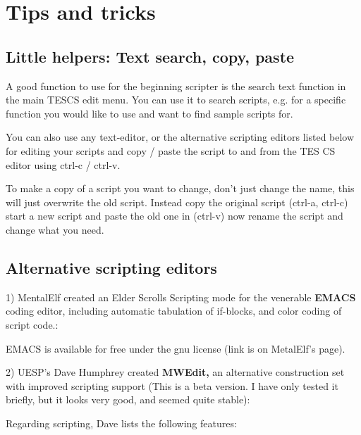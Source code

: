\hypertarget{tips-and-tricks}{%
\section{\texorpdfstring{\hfill\break
Tips and tricks}{ Tips and tricks}}\label{tips-and-tricks}}

\hypertarget{little-helpers-text-search-copy-paste}{%
\subsection{Little helpers: Text search, copy,
paste}\label{little-helpers-text-search-copy-paste}}

A good function to use for the beginning scripter is the search text
function in the main TESCS edit menu. You can use it to search scripts,
e.g. for a specific function you would like to use and want to find
sample scripts for.

You can also use any text-editor, or the alternative scripting editors
listed below for editing your scripts and copy / paste the script to and
from the TES CS editor using ctrl-c / ctrl-v.

To make a copy of a script you want to change, don't just change the
name, this will just overwrite the old script. Instead copy the original
script (ctrl-a, ctrl-c) start a new script and paste the old one in
(ctrl-v) now rename the script and change what you need.

\hypertarget{alternative-scripting-editors}{%
\subsection{Alternative scripting
editors}\label{alternative-scripting-editors}}

1) MentalElf created an Elder Scrolls Scripting mode for the venerable
\textbf{EMACS} coding editor, including automatic tabulation of
if-blocks, and color coding of script code.:


EMACS is available for free under the gnu license (link is on MetalElf's
page).

2) UESP's Dave Humphrey created \textbf{MWEdit,} an alternative
construction set with improved scripting support (This is a beta
version. I have only tested it briefly, but it looks very good, and
seemed quite stable): %

Regarding scripting, Dave lists the following features:

